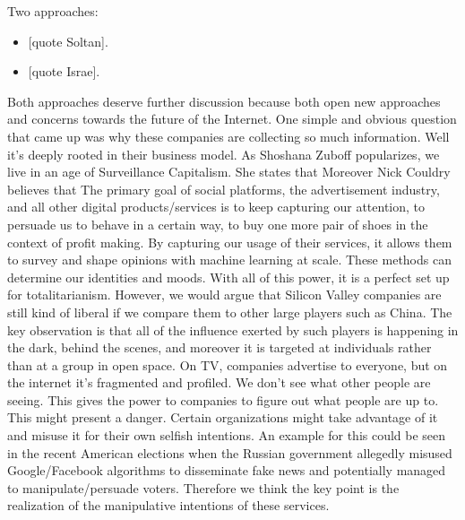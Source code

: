 \documentclass[format=acmsmall, review=false, screen=true]{acmart}
\begin{document}
Two approaches:
\begin{itemize}
		\item{} [quote Soltan]. 
		\item{} [quote Israe].
\end{itemize}

Both approaches deserve further discussion because both open new approaches and concerns towards the future of the Internet. One simple and obvious question that came up was why these companies are collecting so much information. Well it’s deeply rooted in their business model.
As Shoshana Zuboff popularizes, we live in an age of Surveillance Capitalism. She states that  Moreover Nick Couldry believes that 
The primary goal of social platforms, the advertisement industry, and all other digital products/services is to keep capturing our attention, to persuade us to behave in a certain way, to buy one more pair of shoes in the context of profit making. By capturing our usage of their services, it allows them to survey and shape opinions with machine learning at scale. These methods can determine our identities and moods. With all of this power, it is a perfect set up for totalitarianism. However, we would argue that Silicon Valley companies are still kind of liberal if we compare them to other large players such as China. The key observation is that all of the influence exerted by such players is happening in the dark, behind the scenes, and moreover it is targeted at individuals rather than at a group in open space. On TV, companies advertise to everyone, but on the internet it’s fragmented and profiled. We don’t see what other people are seeing. This gives the power to companies to figure out what people are up to.
This might present a danger. Certain organizations might take advantage of it and misuse it for their own selfish intentions. An example for this could be seen in the recent American elections when the Russian government allegedly misused Google/Facebook algorithms to disseminate fake news and potentially managed to manipulate/persuade voters. Therefore we think the key point is the realization of the manipulative intentions of these services.
\end{document}
